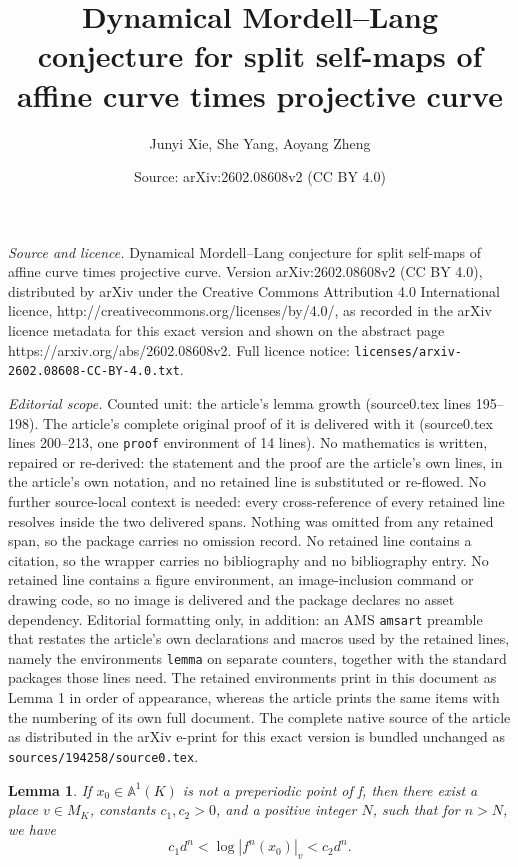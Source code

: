 \documentclass[10pt,a4paper]{amsart}
\title{Dynamical Mordell--Lang conjecture for split self-maps of affine curve times projective curve}
\author{Junyi Xie, She Yang, Aoyang Zheng}
\date{Source: arXiv:2602.08608v2 (CC BY 4.0)}
\newtheorem{lemma}{Lemma}
\begin{document}
\maketitle

\noindent\emph{Source and licence.} Dynamical Mordell--Lang conjecture for split self-maps of affine curve times projective curve. Version arXiv:2602.08608v2 (CC BY 4.0), distributed by arXiv under the Creative Commons Attribution 4.0 International licence, http://creativecommons.org/licenses/by/4.0/, as recorded in the arXiv licence metadata for this exact version and shown on the abstract page https://arxiv.org/abs/2602.08608v2. Full licence notice: \texttt{licenses/arxiv-2602.08608-CC-BY-4.0.txt}.\par\smallskip

\noindent\textit{Editorial scope.} Counted unit: the article's lemma growth (source0.tex lines 195--198). The article's complete original proof of it is delivered with it (source0.tex lines 200--213, one \texttt{proof} environment of 14 lines). No mathematics is written, repaired or re-derived: the statement and the proof are the article's own lines, in the article's own notation, and no retained line is substituted or re-flowed.  No further source-local context is needed: every cross-reference of every retained line resolves inside the two delivered spans.  Nothing was omitted from any retained span, so the package carries no omission record.  No retained line contains a citation, so the wrapper carries no bibliography and no bibliography entry.  No retained line contains a figure environment, an image-inclusion command or drawing code, so no image is delivered and the package declares no asset dependency.  Editorial formatting only, in addition: an AMS \texttt{amsart} preamble that restates the article's own declarations and macros used by the retained lines, namely the environments \texttt{lemma} on separate counters, together with the standard packages those lines need.  The retained environments print in this document as Lemma 1 in order of appearance, whereas the article prints the same items with the numbering of its own full document.  The complete native source of the article as distributed in the arXiv e-print for this exact version is bundled unchanged as \texttt{sources/194258/source0.tex}.
\begin{lemma}\label{norm growth}
    If $x_0 \in \mathbb{A}^1(K)$ is not a preperiodic point of f, then there exist a place $v \in M_K$, constants $c_1,c_2>0$, and a positive integer $N$, such that for $n>N$, we have
    $$ c_1 d^n < \log |f^n(x_0)|_v < c_2 d^n. $$
\end{lemma}
\end{document}
